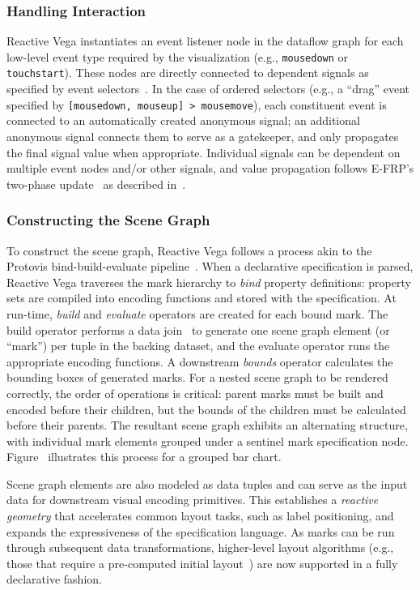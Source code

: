 \subsubsection{Handling Interaction}

Reactive Vega instantiates an event listener node in the dataflow graph for each
low-level event type required by the visualization (e.g., \texttt{mousedown} or
\texttt{touchstart}). These nodes are directly connected to dependent signals as
specified by event selectors~\cite{satyanarayan:declarative}. In the case of
ordered selectors (e.g., a ``drag'' event specified by \texttt{[mousedown,
mouseup] > mousemove}), each constituent event is connected to an automatically
created anonymous signal; an additional anonymous signal connects them to serve
as a gatekeeper, and only propagates the final signal value when appropriate.
Individual signals can be dependent on multiple event nodes and/or other
signals, and value propagation follows E-FRP's two-phase update~\cite{wan:efrp}
as described in~.

\subsubsection{Constructing the Scene Graph}

To construct the scene graph, Reactive Vega follows a process akin to the
Protovis bind-build-evaluate pipeline~\cite{heer:protovisjava}. When a
declarative specification is parsed, Reactive Vega traverses the mark hierarchy
to \emph{bind} property definitions: property sets are compiled into encoding
functions and stored with the specification. At run-time, \emph{build} and
\emph{evaluate} operators are created for each bound mark. The build operator
performs a data join~\cite{bostock:d3} to generate one scene graph element (or
``mark'') per tuple in the backing dataset, and the evaluate operator runs the
appropriate encoding functions. A downstream \emph{bounds} operator calculates
the bounding boxes of generated marks. For a nested scene graph to be rendered
correctly, the order of operations is critical: parent marks must be built and
encoded before their children, but the bounds of the children must be calculated
before their parents. The resultant scene graph exhibits an alternating
structure, with individual mark elements grouped under a sentinel mark
specification node. Figure~ illustrates this process for
a grouped bar chart.

Scene graph elements are also modeled as data tuples and can serve as the input
data for downstream visual encoding primitives. This establishes a
\emph{reactive geometry} that accelerates common layout tasks, such as label
positioning, and expands the expressiveness of the specification language. As
marks can be run through subsequent data transformations, higher-level layout
algorithms (e.g., those that require a pre-computed initial
layout~\cite{flexbox}) are now supported in a fully declarative fashion.

